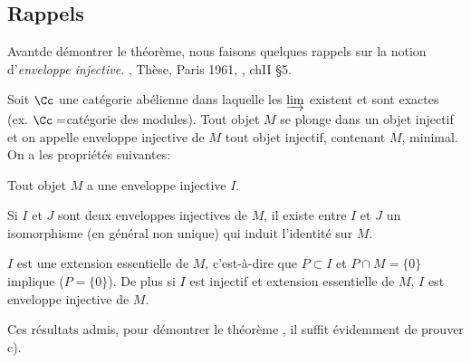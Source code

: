 \subsection*{Rappels}
Avant\pageoriginale de d\'emontrer le th\'eor\`eme, nous faisons quelques rappels sur la notion d'\emph{enveloppe injective}. \Cf {}, Th\`ese, Paris 1961, , ch\ptbl II \S 5.

Soit $\Cc$ une cat\'egorie ab\'elienne dans laquelle les $\varinjlim$ existent et sont exactes (ex. $\Cc=$cat\'egorie des modules). Tout objet $M$ se plonge dans un objet injectif et on appelle enveloppe injective de $M$ tout objet injectif, contenant $M$, minimal. On a les propri\'et\'es suivantes:
\begin{enumeratei}
\item
Tout objet $M$ a une enveloppe injective $I$.
\item
Si $I$ et $J$ sont deux enveloppes injectives de $M$, il existe entre $I$ et $J$ un isomorphisme (en g\'en\'eral non unique) qui induit l'identit\'e sur $M$.
\item
$I$ est une extension essentielle\label{pIV.13} de $M$, c'est-\`a-dire que $P\subset I$ et $P\cap M=\{ 0\}$ implique ($P=\{ 0\}$). De plus si $I$ est injectif et extension essentielle de $M$, $I$ est enveloppe injective de $M$.
\end{enumeratei}

Ces r\'esultats admis, pour d\'emontrer le th\'eor\`eme , il suffit \'evidemment de prouver c).

